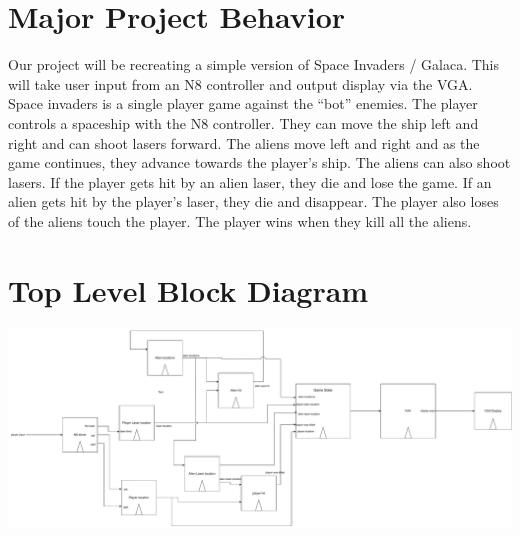 \documentclass[11pt, titlepage]{article}
\author{Donovan Clay (ID: 2276005), Cameron Jennings (ID: 2029631)}
\title{\assignmentname}
\date{\parbox{\linewidth}{\centering
\experimentDate
  \endgraf\bigskip
  \className\
}}
\begin{document}
	\maketitle
 
    \setcounter{tocdepth}{2}
    \begin{center}
        \tableofcontents\label{beginning}
    \end{center}
    \newpage
    
    \section{Major Project Behavior}
        \begin{tcolorbox}
            Our project will be recreating a simple version of Space Invaders / Galaca. This will take user input from an N8 controller and output display via the VGA. Space invaders is a single player game against the ``bot'' enemies. The player controls a spaceship with the N8 controller. They can move the ship left and right and can shoot lasers forward. The aliens move left and right and as the game continues, they advance towards the player's ship. The aliens can also shoot lasers. If the player gets hit by an alien laser, they die and lose the game. If an alien gets hit by the player's laser, they die and disappear. The player also loses of the aliens touch the player. The player wins when they kill all the aliens.
        \end{tcolorbox}
    \section{Top Level Block Diagram}
        \begin{tcolorbox}
            \begin{center}
                \includegraphics[scale=0.24]{Lab 6 Proposal.pdf}
            \end{center}
        \end{tcolorbox}
\end{document}
